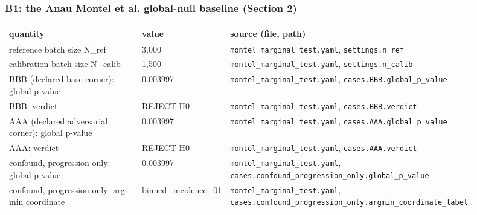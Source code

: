 \subsubsection*{B1: the Anau Montel et al. global-null baseline (Section 2)}
\begin{longtable}{p{0.35\linewidth} p{0.14\linewidth} p{0.41\linewidth}}
\toprule
quantity & value & source (file, path) \\
\midrule
\endhead
reference batch size N\_ref & 3,000 & \texttt{\footnotesize montel\_\allowbreak{}marginal\_\allowbreak{}test.\allowbreak{}yaml}, \texttt{\footnotesize settings.\allowbreak{}n\_\allowbreak{}ref} \\
calibration batch size N\_calib & 1,500 & \texttt{\footnotesize montel\_\allowbreak{}marginal\_\allowbreak{}test.\allowbreak{}yaml}, \texttt{\footnotesize settings.\allowbreak{}n\_\allowbreak{}calib} \\
BBB (declared base corner): global p-value & 0.003997 & \texttt{\footnotesize montel\_\allowbreak{}marginal\_\allowbreak{}test.\allowbreak{}yaml}, \texttt{\footnotesize cases.\allowbreak{}BBB.\allowbreak{}global\_\allowbreak{}p\_\allowbreak{}value} \\
BBB: verdict & REJECT H0 & \texttt{\footnotesize montel\_\allowbreak{}marginal\_\allowbreak{}test.\allowbreak{}yaml}, \texttt{\footnotesize cases.\allowbreak{}BBB.\allowbreak{}verdict} \\
AAA (declared adversarial corner): global p-value & 0.003997 & \texttt{\footnotesize montel\_\allowbreak{}marginal\_\allowbreak{}test.\allowbreak{}yaml}, \texttt{\footnotesize cases.\allowbreak{}AAA.\allowbreak{}global\_\allowbreak{}p\_\allowbreak{}value} \\
AAA: verdict & REJECT H0 & \texttt{\footnotesize montel\_\allowbreak{}marginal\_\allowbreak{}test.\allowbreak{}yaml}, \texttt{\footnotesize cases.\allowbreak{}AAA.\allowbreak{}verdict} \\
confound, progression only: global p-value & 0.003997 & \texttt{\footnotesize montel\_\allowbreak{}marginal\_\allowbreak{}test.\allowbreak{}yaml}, \texttt{\footnotesize cases.\allowbreak{}confound\_\allowbreak{}progression\_\allowbreak{}only.\allowbreak{}global\_\allowbreak{}p\_\allowbreak{}value} \\
confound, progression only: arg-min coordinate & binned\_incidence\_01 & \texttt{\footnotesize montel\_\allowbreak{}marginal\_\allowbreak{}test.\allowbreak{}yaml}, \texttt{\footnotesize cases.\allowbreak{}confound\_\allowbreak{}progression\_\allowbreak{}only.\allowbreak{}argmin\_\allowbreak{}coordinate\_\allowbreak{}label} \\

\end{longtable}
